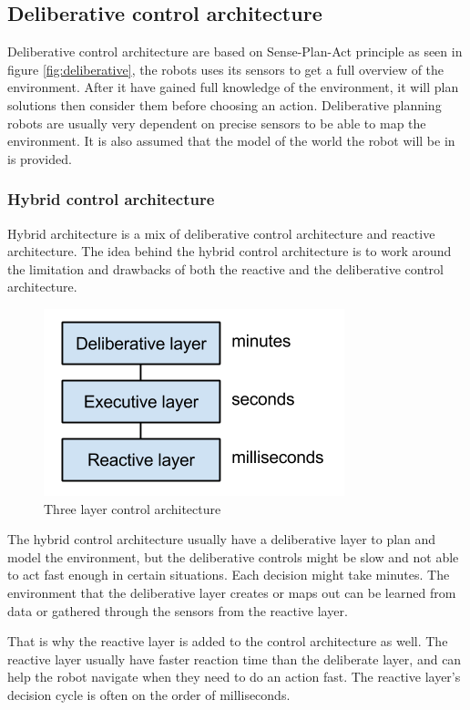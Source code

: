 \subsection{Deliberative control architecture}
Deliberative control architecture are based on Sense-Plan-Act principle as seen in figure \ref{fig:deliberative}, the robots uses its sensors to get a full overview of the environment. After it have gained full knowledge of the environment, it will plan solutions then consider them before choosing an action. Deliberative planning robots are usually very dependent on precise sensors to be able to map the environment. It is also assumed that the model of the world the robot will be in is provided. 

\subsubsection{Hybrid control architecture}
\label{sec:hybrid}
Hybrid architecture is a mix of deliberative control architecture and reactive architecture. The idea behind the hybrid control architecture is to work around the limitation and drawbacks of both the reactive and the deliberative control architecture.

\begin{figure}[H]
    \centering
    \includegraphics[width=0.5\linewidth]{figs/threelayer}
    \caption[Three layer architecture]{Three layer control architecture}
    \label{fig:threelayer}
\end{figure}

The hybrid control architecture usually have a deliberative layer to plan and model the environment, but the deliberative controls might be slow and not able to act fast enough in certain situations. Each decision might take minutes. The environment that the deliberative layer creates or maps out can be learned from data or gathered through the sensors from the reactive layer.

That is why the reactive layer is added to the control architecture as well. The reactive layer usually have faster reaction time than the deliberate layer, and can help the robot navigate when they need to do an action fast. The reactive layer's decision cycle is often on the order of milliseconds.

